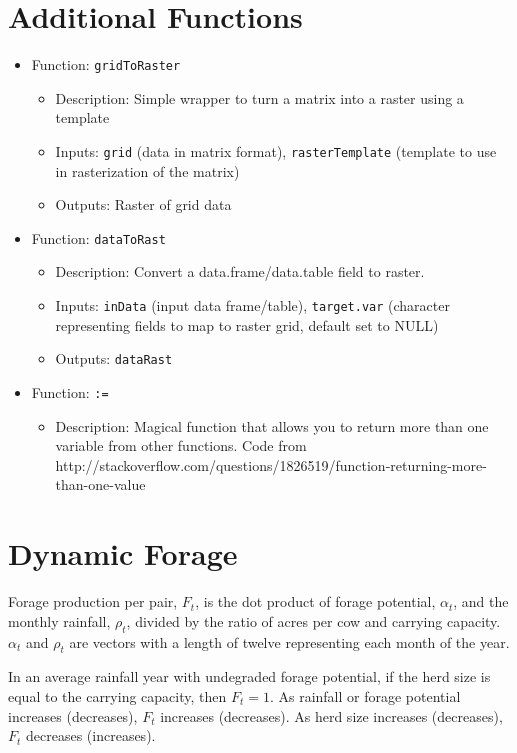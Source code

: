 \documentclass[11pt]{article}
\begin{document}
\section{Additional Functions}
\begin{itemize}
\item Function: \verb!gridToRaster!
	\begin{itemize}
	\item Description: Simple wrapper to turn a matrix into a raster using a template
    \item Inputs: \verb!grid! (data in matrix format), \verb!rasterTemplate! (template to use in rasterization of the matrix)
    \item Outputs: Raster of grid data
	\end{itemize}
\item Function: \verb!dataToRast!
	\begin{itemize}
	\item Description: Convert a data.frame/data.table field to raster.
	\item Inputs: \verb!inData! (input data frame/table), \verb!target.var! (character representing fields to map to raster grid, default set to NULL)
	\item Outputs: \verb!dataRast!
	\end{itemize}
\item Function: \verb!:=!
	\begin{itemize}
	\item Description: Magical function that allows you to return more than one variable from other functions. Code from http://stackoverflow.com/questions/1826519/function-returning-more-than-one-value
	\end{itemize}
\end{itemize}






\section{Dynamic Forage}
Forage production per pair, $F_t$, is the dot product of forage potential, $\alpha_t$, and the monthly rainfall, $\rho_t$, divided by the ratio of acres per cow and carrying capacity. $\alpha_t$ and $\rho_t$ are vectors with a length of twelve representing each month of the year. 

In an average rainfall year with undegraded forage potential, if the herd size is equal to the carrying capacity, then $F_t = 1$. As rainfall or forage potential increases (decreases), $F_t$ increases (decreases). As herd size increases (decreases), $F_t$ decreases (increases). 
\end{document}
